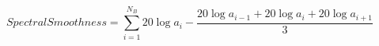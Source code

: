 \begin{displaymath}
\mathit{SpectralSmoothness} = \sum_{i=1}^{N_B} 20 \log a_i - \frac{20\log a_{i-1} + 20\log a_{i} + 20\log a_{i+1}}{3}
\label{eq:spectral_smoothness}
\end{displaymath}
